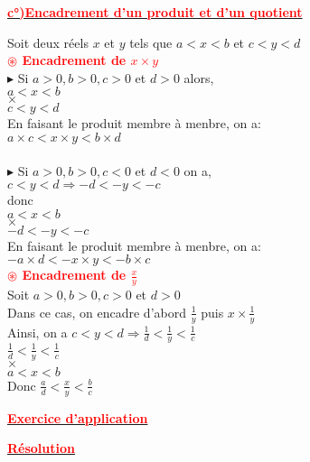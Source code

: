 \documentclass[12pt]{article}
\begin{document}
\begin{center}
\underline{\textbf{\textcolor{red}{c°)Encadrement d'un produit et d'un quotient}}}\\
\end{center}
Soit deux réels $x$ et $y$ tels que $a<x<b$ et $c<y<d$ \\
\textbf{\textcolor{red}{$\circledast$ Encadrement de $x \times y$}}\\
$\blacktriangleright$ Si $a>0,b>0,c>0$ et $d>0$ alors,\\
$a<x<b$\\
$\times$\\
$c<y<d$\\
En faisant le produit membre à menbre, on a:\\
$a\times c <x\times y <b\times d$\\
\\
$\blacktriangleright$ Si $a>0,b>0,c<0$ et $d<0$ on a,\\
$c<y<d \Rightarrow -d<-y<-c$\\
donc\\
$a<x<b$\\
$\times$\\
$-d<-y<-c$\\
En faisant le produit membre à menbre, on a:\\
$-a\times d <-x\times y <-b\times c$\\
\textbf{\textcolor{red}{$\circledast$ Encadrement de $\frac{x}{y}$}}\\
Soit $a>0,b>0,c>0$ et $d>0$  \\
Dans ce cas, on encadre d'abord $\frac{1}{y}$ puis $x\times\frac{1}{y}$\\
Ainsi, on a $c<y<d \Rightarrow \frac{1}{d}<\frac{1}{y}<\frac{1}{c}$
\\
$\frac{1}{d}<\frac{1}{y}<\frac{1}{c}$\\
$\times$\\
$a<x<b$\\
Donc $\frac{a}{d}<\frac{x}{y}<\frac{b}{c}$\\
\begin{center}
\underline{\textbf{\textcolor{red}{Exercice d'application }}}\\
\end{center}

\begin{center}
\underline{\textbf{\textcolor{red}{Résolution}}}\\
\end{center}
\end{document}
